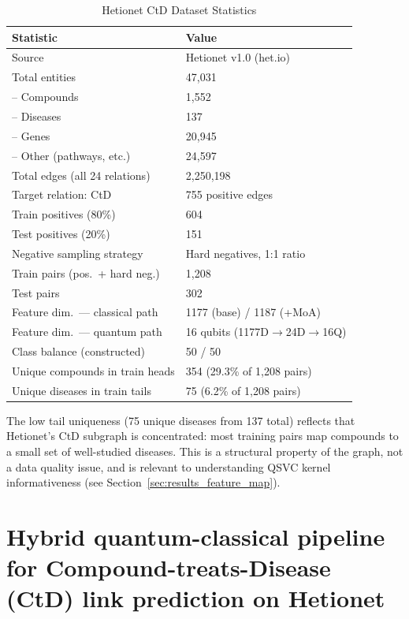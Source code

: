 \documentclass[twocolumn,10pt]{article}
\begin{document}
\begin{table}[t]
\centering
\caption{Hetionet CtD Dataset Statistics}
\label{tab:dataset}
\begin{tabular}{@{}ll@{}}
\toprule
\textbf{Statistic} & \textbf{Value} \\
\midrule
Source & Hetionet v1.0 (het.io) \\
Total entities & 47,031 \\
\quad-- Compounds & 1,552 \\
\quad-- Diseases & 137 \\
\quad-- Genes & 20,945 \\
\quad-- Other (pathways, etc.) & 24,597 \\
Total edges (all 24 relations) & 2,250,198 \\
Target relation: CtD & 755 positive edges \\
Train positives (80\%) & 604 \\
Test positives (20\%) & 151 \\
Negative sampling strategy & Hard negatives, 1:1 ratio \\
Train pairs (pos.\ + hard neg.) & 1,208 \\
Test pairs & 302 \\
Feature dim.\ --- classical path & 1177 (base) / 1187 (+MoA) \\
Feature dim.\ --- quantum path & 16 qubits (1177D$\to$24D$\to$16Q) \\
Class balance (constructed) & 50 / 50 \\
Unique compounds in train heads & 354 (29.3\% of 1,208 pairs) \\
Unique diseases in train tails & 75 (6.2\% of 1,208 pairs) \\
\bottomrule
\end{tabular}
\end{table}

The low tail uniqueness (75 unique diseases from 137 total) reflects that Hetionet's CtD subgraph is concentrated: most training pairs map compounds to a small set of well-studied diseases. This is a structural property of the graph, not a data quality issue, and is relevant to understanding QSVC kernel informativeness (see Section~\ref{sec:results_feature_map}).

\FloatBarrier
\section[Hybrid pipeline for CtD link prediction]{Hybrid quantum-classical pipeline for Compound-treats-Disease (CtD) link prediction on Hetionet}
\end{document}
